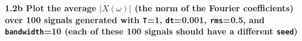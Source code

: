 \documentclass{article}
\begin{document}
    \begin{center}
    \end{center}
    { \hspace*{\fill} \\}
    
    \paragraph{1.2b Plot the average $|X(\omega)|$ (the norm of the Fourier
coefficients) over 100 signals generated with \texttt{T}=1,
\texttt{dt}=0.001, \texttt{rms}=0.5, and \texttt{bandwidth}=10 (each of
these 100 signals should have a different
\texttt{seed})}\label{b-plot-the-average-xomega-the-norm-of-the-fourier-coefficients-over-100-signals-generated-with-t1-dt0.001-rms0.5-and-bandwidth10-each-of-these-100-signals-should-have-a-different-seed}
\end{document}

